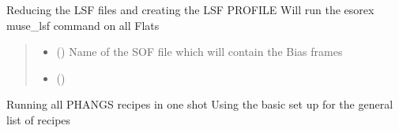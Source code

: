 \documentclass[letterpaper,10pt,english]{sphinxmanual}
\begin{document}
\begin{fulllineitems}
\begin{fulllineitems}
\label{\detokenize{api/pymusepipe:pymusepipe.prep_recipes_pipe.PipePrep.run_lsf}}
\pysigstartsignatures
{}
\pysigstopsignatures
\sphinxAtStartPar
Reducing the LSF files and creating the LSF PROFILE
Will run the esorex muse\_lsf command on all Flats
\begin{quote}\begin{description}
\begin{itemize}
\item {} 
\sphinxAtStartPar
{} (\sphinxstyleliteralemphasis{\sphinxupquote{ (}}\sphinxstyleliteralemphasis{\sphinxupquote{)}}) \textendash{} Name of the SOF file which will contain the Bias frames

\item {} 
\sphinxAtStartPar
{} () \textendash{} 

\end{itemize}

\end{description}\end{quote}

\end{fulllineitems}


\begin{fulllineitems}
\label{\detokenize{api/pymusepipe:pymusepipe.prep_recipes_pipe.PipePrep.run_phangs_recipes}}
\pysigstartsignatures
{}
\pysigstopsignatures
\sphinxAtStartPar
Running all PHANGS recipes in one shot
Using the basic set up for the general list of recipes



\end{fulllineitems}
\end{fulllineitems}
\end{document}
